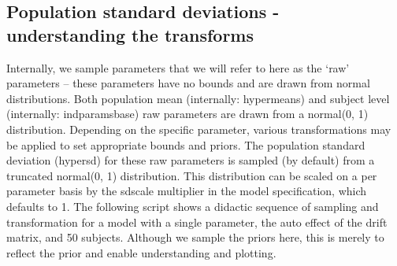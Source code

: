 \documentclass[nojss]{jss}\usepackage[]{graphicx}\usepackage[]{color}
\begin{document}
\subsection{Population standard deviations - understanding the transforms}
Internally, we sample parameters that we will refer to here as the `raw' parameters -- these parameters have no bounds and are drawn from normal distributions. Both population mean (internally: hypermeans) and subject level (internally: indparamsbase) raw parameters are drawn from a normal(0, 1) distribution. Depending on the specific parameter, various transformations may be applied to set appropriate bounds and priors. The population standard deviation (hypersd) for these raw parameters is sampled (by default) from a truncated normal(0, 1) distribution. This distribution can be scaled on a per parameter basis by the sdscale multiplier in the model specification, which defaults to 1. The following script shows a didactic sequence of sampling and transformation for a model with a single parameter, the auto effect of the drift matrix, and 50 subjects. Although we sample the priors here, this is merely to reflect the prior and enable understanding and plotting.
\end{document}
